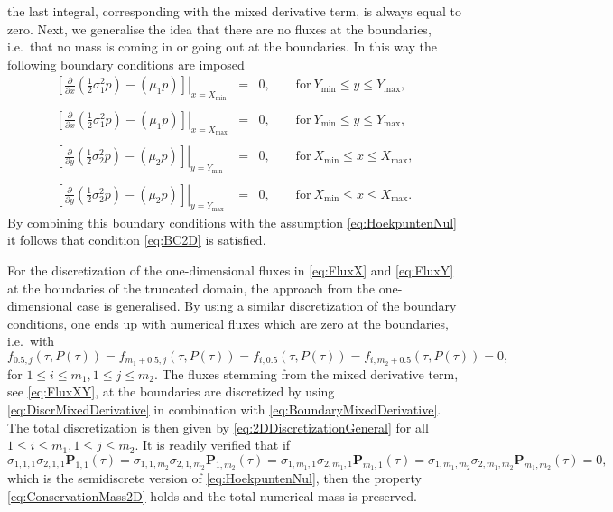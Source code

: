\documentclass[10pt]{article}
\begin{document}
the last integral, corresponding with the mixed derivative term, is always equal to zero.
Next, we generalise the idea that there are no fluxes at the boundaries, i.e.\ that no mass is coming in or going out at the boundaries.
In this way the following boundary conditions are imposed
\begin{eqnarray*}
\left. \left[ \tfrac{\partial}{\partial x} \left( \tfrac{1}{2} \sigma_{1}^{2}p \right) - \left( \mu_{1} p \right) \right]\right\vert_{x=X_{\min}} &=& 0, \qquad \mathrm{for} \ Y_{\min} \le y \le Y_{\max}, \\\\
\left. \left[ \tfrac{\partial}{\partial x} \left( \tfrac{1}{2} \sigma_{1}^{2}p \right) - \left( \mu_{1} p \right) \right]\right\vert_{x=X_{\max}} &=& 0, \qquad \mathrm{for} \ Y_{\min} \le y \le Y_{\max}, \\\\
\left. \left[ \tfrac{\partial}{\partial y} \left( \tfrac{1}{2} \sigma_{2}^{2}p \right) - \left( \mu_{2} p \right) \right]\right\vert_{y=Y_{\min}} &=& 0, \qquad \mathrm{for} \ X_{\min} \le x \le X_{\max}, \\\\
\left. \left[ \tfrac{\partial}{\partial y} \left( \tfrac{1}{2} \sigma_{2}^{2}p \right) - \left( \mu_{2} p \right) \right]\right\vert_{y=Y_{\max}} &=& 0, \qquad \mathrm{for} \ X_{\min} \le x \le X_{\max}.
\end{eqnarray*}
By combining this boundary conditions with the assumption \eqref{eq:HoekpuntenNul} it follows that condition \eqref{eq:BC2D} is satisfied.

For the discretization of the one-dimensional fluxes in \eqref{eq:FluxX} and \eqref{eq:FluxY} at the boundaries of the truncated domain, the approach from the one-dimensional case is generalised. By using a similar discretization of the boundary conditions, one ends up with numerical fluxes which are zero at the boundaries, i.e.\ with
$$ f_{0.5,j}(\tau,P(\tau)) = f_{m_{1}+0.5,j}(\tau,P(\tau)) = f_{i,0.5}(\tau,P(\tau)) = f_{i,m_{2} + 0.5}(\tau,P(\tau)) = 0, $$
for $1 \leq i \le m_{1}, 1 \le j \le m_{2}$.
The fluxes stemming from the mixed derivative term, see \eqref{eq:FluxXY}, at the boundaries are discretized by using \eqref{eq:DiscrMixedDerivative} in combination with \eqref{eq:BoundaryMixedDerivative}. 
The total discretization is then given by \eqref{eq:2DDiscretizationGeneral} for all $1 \le i \le m_{1}, 1 \le j \le m_{2}$.
It is readily verified that if
$$ \sigma_{1,1,1} \sigma_{2,1,1} \boldsymbol{P}_{1,1}(\tau) = \sigma_{1,1,m_{2}} \sigma_{2,1,m_{2}} \boldsymbol{P}_{1,m_{2}}(\tau) = \sigma_{1,m_{1},1} \sigma_{2,m_{1},1} \boldsymbol{P}_{m_{1},1}(\tau) = \sigma_{1,m_{1},m_{2}} \sigma_{2,m_{1},m_{2}} \boldsymbol{P}_{m_{1},m_{2}}(\tau)=0, $$
which is the semidiscrete version of \eqref{eq:HoekpuntenNul}, then the property \eqref{eq:ConservationMass2D} holds and the total numerical mass is preserved.
\end{document}
